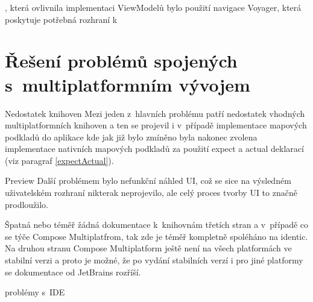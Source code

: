 , která ovlivnila implementaci ViewModelů bylo použití navigace Voyager, která poskytuje potřebná rozhraní k 



\section{Řešení problémů spojených s~multiplatformním vývojem} %
Nedostatek knihoven
Mezi jeden z~hlavních problému patří nedostatek vhodných multiplatformních knihoven a ten se projevil i v~případě implementace mapových podkladů
do aplikace kde jak již bylo zmíněno byla nakonec zvolena implementace nativních mapových podkladů za použití expect a actual deklarací (viz paragraf \ref{expectActual}).

Preview
Další problémem bylo nefunkční náhled UI, což se sice na výsledném uživatelském rozhraní nikterak neprojevilo, ale celý proces tvorby UI to značně 
prodloužilo.

Špatná nebo téměř žádná dokumentace k~knihovnám třetích stran a v~případě co se týče Compose Multiplatfrom, tak zde je téměř kompletně spoléháno na
identic. 
Na druhou stranu Compose Multiplatform ještě není na všech platformách ve stabilní verzi a proto je možné, že po vydání stabilních verzí i pro jiné
platformy se dokumentace od JetBrains rozříší.

problémy s~IDE 


